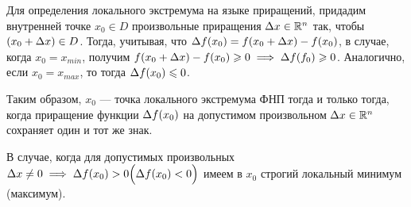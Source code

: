 \documentclass[../../main.tex]{subfiles}
\begin{document}
	Для определения локального экстремума на языке приращений,
	придадим внутренней точке $x_0 \in D$
	произвольные приращения $\Delta x \in \mathbb{R}^n$ так,
	чтобы $(x_0 + \Delta x) \in D$.
	Тогда, учитывая, что $\Delta f (x_0)
	= f (x_0 + \Delta x) - f (x_0)$,
	в случае, когда $x_0 = x_{min}$, получим
	$f (x_0 + \Delta x) - f (x_0) \geqslant 0
	\implies
	\Delta f (f_0) \geqslant 0$.
	Аналогично, если $x_0 = x_{max}$,
	то тогда $\Delta f (x_0) \leqslant 0$.

	Таким образом, $x_0$ --- точка локального экстремума ФНП
	тогда и только тогда, когда
	приращение функции $\Delta f (x_0)$ на допустимом
	произвольном $\Delta x \in \mathbb{R}^n$ сохраняет один и тот же знак.
	
	В случае, когда для допустимых произвольных $\Delta x \ne 0 \implies
	\Delta f (x_0) > 0 \displaystyle
	\Big(\Delta f (x_0) < 0\Big)$
	имеем в $x_0$ строгий локальный минимум (максимум).
	
\end{document}
